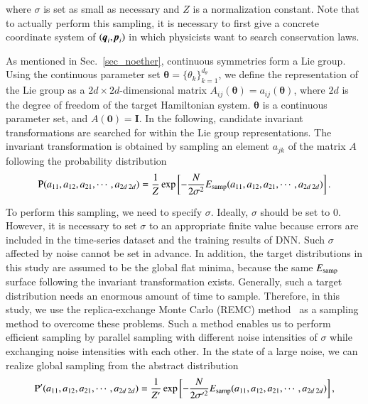 \documentclass[preprint,
bibnotes,
 amsmath,amssymb,
 aps,
]{revtex4-1}
\begin{document}
where $\sigma$ is set as small as necessary and $Z$ is a normalization constant. 
Note that to actually perform this sampling, it is necessary to first give a concrete coordinate system of $(\textit{\textbf{q}}_i, \textit{\textbf{p}}_i)$ in which physicists want to search conservation laws.\par
As mentioned in Sec.~\ref{sec_noether}, continuous symmetries form a Lie group. 
Using the continuous parameter set $\boldsymbol{\theta} = \{\theta_k \}_{k=1}^{d_{\theta}}$, we define the representation of the Lie group as a $2d\times 2d$-dimensional matrix 
$A_{ij}(\boldsymbol{\theta}) = a_{ij}(\boldsymbol{\theta})$, where $2d$ is the degree of freedom of the target Hamiltonian system. 
$\boldsymbol{\theta}$ is a continuous parameter set, and $A(\boldsymbol{0}) = \boldsymbol{I}$. 
In the following, candidate invariant transformations are searched for within the Lie group representations. 
The invariant transformation is obtained by sampling an element $a_{jk}$ of the matrix $A$ following the probability distribution
\begin{equation}
\label{samp_func0}
{\rm P}(a_{11},a_{12},a_{21},\cdots,a_{2d\:2d}) = \frac{1}{Z} \exp\left[-\frac{N}{2\sigma^2} E_{\rm samp}(a_{11},a_{12},a_{21},\cdots,a_{2d\:2d})\right]. 
\end{equation}\par
To perform this sampling, we need to specify $\sigma$. Ideally, $\sigma$ should be set to $0$. However, it is necessary to set $\sigma$ to an appropriate finite value because errors are included in the time-series dataset and the training results of DNN. 
Such $\sigma$ affected by noise cannot be set in advance. 
In addition, the target distributions in this study are assumed to be the global flat minima, because the same $E_{\rm samp}$ surface following the invariant transformation exists. 
Generally, such a target distribution needs an enormous amount of time to sample. 
Therefore, in this study, we use the replica-exchange Monte Carlo (REMC) method~\cite{hukushima1996exchange} as a sampling method to overcome these problems. 
Such a method enables us to perform efficient sampling by parallel sampling with different noise intensities of $\sigma$ while exchanging noise intensities with each other. 
In the state of a large noise, we can realize global sampling from the abstract distribution
\begin{eqnarray}
\label{samp_func}
{\rm P}'(a_{11},a_{12},a_{21},\cdots,a_{2d\:2d}) = \frac{1}{Z'} \exp\left[-\frac{N}{2\sigma'^2} E_{\rm samp}(a_{11},a_{12},a_{21},\cdots,a_{2d\:2d})\right],
\end{eqnarray}
\end{document}
